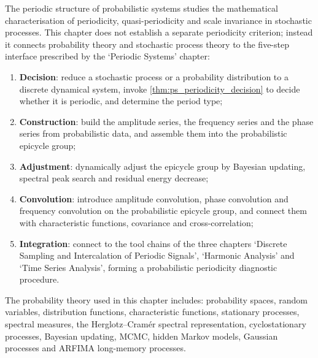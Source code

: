 \begin{remark}\label{rem:prob_chapter_positioning}
The periodic structure of probabilistic systems studies the mathematical characterisation of periodicity, quasi-periodicity and scale invariance in stochastic processes. This chapter does not establish a separate periodicity criterion; instead it connects probability theory and stochastic process theory to the five-step interface prescribed by the `Periodic Systems' chapter:
\begin{enumerate}[label=(\arabic*)]
    \item \textbf{Decision}: reduce a stochastic process or a probability distribution to a discrete dynamical system, invoke \cref{thm:ps_periodicity_decision} to decide whether it is periodic, and determine the period type;
    \item \textbf{Construction}: build the amplitude series, the frequency series and the phase series from probabilistic data, and assemble them into the probabilistic epicycle group;
    \item \textbf{Adjustment}: dynamically adjust the epicycle group by Bayesian updating, spectral peak search and residual energy decrease;
    \item \textbf{Convolution}: introduce amplitude convolution, phase convolution and frequency convolution on the probabilistic epicycle group, and connect them with characteristic functions, covariance and cross-correlation;
    \item \textbf{Integration}: connect to the tool chains of the three chapters `Discrete Sampling and Intercalation of Periodic Signals', `Harmonic Analysis' and `Time Series Analysis', forming a probabilistic periodicity diagnostic procedure.
\end{enumerate}
The probability theory used in this chapter includes: probability spaces, random variables, distribution functions, characteristic functions, stationary processes, spectral measures, the Herglotz--Cramér spectral representation, cyclostationary processes, Bayesian updating, MCMC, hidden Markov models, Gaussian processes and ARFIMA long-memory processes.
\end{remark}

